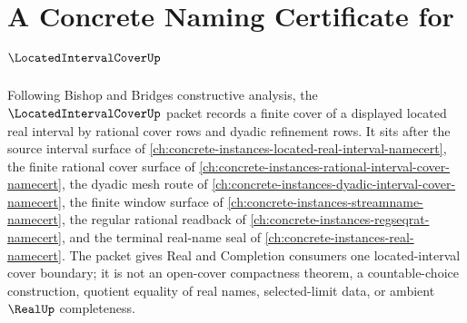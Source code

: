 \chapter{A Concrete Naming Certificate for $\LocatedIntervalCoverUp$}
\label{ch:concrete-instances-located-interval-cover-namecert}

Following Bishop and Bridges constructive analysis, the $\LocatedIntervalCoverUp$ packet records a finite cover of a displayed located real interval by rational cover rows and dyadic refinement rows. It sits after the source interval surface of \autoref{ch:concrete-instances-located-real-interval-namecert}, the finite rational cover surface of \autoref{ch:concrete-instances-rational-interval-cover-namecert}, the dyadic mesh route of \autoref{ch:concrete-instances-dyadic-interval-cover-namecert}, the finite window surface of \autoref{ch:concrete-instances-streamname-namecert}, the regular rational readback of \autoref{ch:concrete-instances-regseqrat-namecert}, and the terminal real-name seal of \autoref{ch:concrete-instances-real-namecert}. The packet gives Real and Completion consumers one located-interval cover boundary; it is not an open-cover compactness theorem, a countable-choice construction, quotient equality of real names, selected-limit data, or ambient $\RealUp$ completeness.

